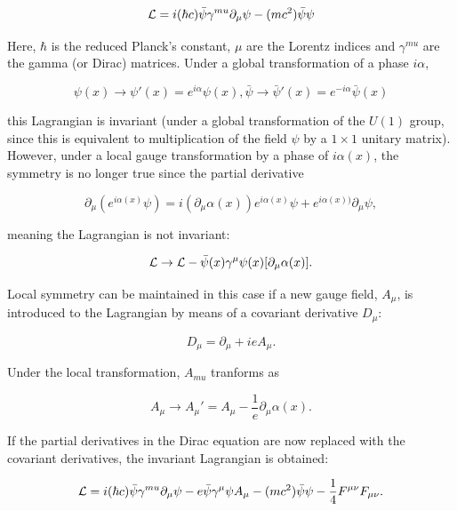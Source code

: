 \begin{equation}
\mathcal{L} = i (\hbar c) \bar{\psi} \gamma^{mu} \partial_{\mu} \psi - (mc^{2}) \bar{\psi} \psi
\end{equation}

Here, $\hbar$ is the reduced Planck's constant, $\mu$ are the Lorentz indices and $\gamma^{mu}$ are the gamma
(or Dirac) matrices. Under a global transformation of a phase $i \alpha$, 

\begin{equation}
\psi(x) \rightarrow \psi'(x) = e^{i\alpha}\psi(x), \bar{\psi} \rightarrow \bar{\psi}'(x) =
e^{-i\alpha}\bar{\psi}(x)
\end{equation}

this Lagrangian is invariant (\ie under a global transformation of the $U(1)$ group, since this is
equivalent to multiplication of the field $\psi$ by a $1 \times 1$ unitary matrix). However, under a local
gauge transformation by a phase of $i\alpha(x)$, the symmetry is no longer true since the partial derivative

\begin{equation}
\partial_{\mu}(e^{i\alpha(x)}\psi) = i(\partial_{\mu}\alpha(x))e^{i\alpha(x)}\psi +
e^{i\alpha(x))}\partial_{\mu}\psi ,
\end{equation}

meaning the Lagrangian is not invariant:

\begin{equation}
\mathcal{L} \rightarrow \mathcal{L} - \bar{\psi}(x)\gamma^{\mu}\psi(x)[\partial_{\mu}\alpha(x)].
\end{equation}

Local symmetry can be maintained in this case if a new gauge field, $A_\mu$, is introduced to the Lagrangian
by means of a covariant derivative $D_\mu$:

\begin{equation}
D_{\mu} = \partial_{\mu} + ieA_{\mu}.
\end{equation}

Under the local transformation, $A_{mu}$ tranforms as

\begin{equation}
A_{\mu} \rightarrow A_{\mu}' = A_{\mu} - \frac{1}{e}\partial_{\mu}\alpha(x).
\end{equation}

If the partial derivatives in the Dirac equation are now replaced with the covariant derivatives, the
invariant Lagrangian is obtained:

\begin{equation}
\mathcal{L} = i (\hbar c) \bar{\psi} \gamma^{mu} \partial_{\mu} \psi - e \bar{\psi} \gamma^{\mu} \psi A_{\mu} -
(mc^{2}) \bar{\psi} \psi - \frac{1}{4}F^{\mu\nu}F_{\mu\nu}.
\end{equation}

